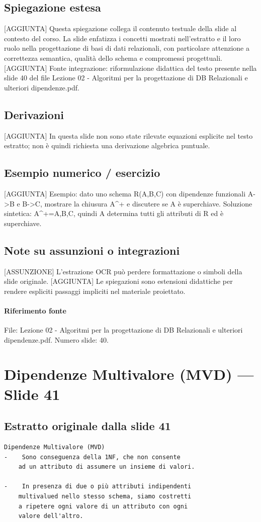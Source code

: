 \documentclass[11pt]{article}
\begin{document}
\subsection*{Spiegazione estesa}
[AGGIUNTA] Questa spiegazione collega il contenuto testuale della slide al contesto del corso. La slide enfatizza i concetti mostrati nell'estratto e il loro ruolo nella progettazione di basi di dati relazionali, con particolare attenzione a correttezza semantica, qualità dello schema e compromessi progettuali.
[AGGIUNTA] Fonte integrazione: riformulazione didattica del testo presente nella slide 40 del file Lezione 02 - Algoritmi per la progettazione di DB Relazionali e ulteriori dipendenze.pdf.
\subsection*{Derivazioni}
[AGGIUNTA] In questa slide non sono state rilevate equazioni esplicite nel testo estratto; non è quindi richiesta una derivazione algebrica puntuale.
\subsection*{Esempio numerico / esercizio}
[AGGIUNTA] Esempio: dato uno schema R(A,B,C) con dipendenze funzionali A->B e B->C, mostrare la chiusura A^+ e discutere se A è superchiave. Soluzione sintetica: A^+={A,B,C}, quindi A determina tutti gli attributi di R ed è superchiave.
\subsection*{Note su assunzioni o integrazioni}
[ASSUNZIONE] L'estrazione OCR può perdere formattazione o simboli della slide originale.
[AGGIUNTA] Le spiegazioni sono estensioni didattiche per rendere espliciti passaggi impliciti nel materiale proiettato.
\paragraph{Riferimento fonte} File: Lezione 02 - Algoritmi per la progettazione di DB Relazionali e ulteriori dipendenze.pdf. Numero slide: 40.
\section{Dipendenze Multivalore (MVD) --- Slide 41}
\subsection*{Estratto originale dalla slide 41}
\begin{lstlisting}
Dipendenze Multivalore (MVD)
-    Sono conseguenza della 1NF, che non consente
    ad un attributo di assumere un insieme di valori.

-    In presenza di due o più attributi indipendenti
    multivalued nello stesso schema, siamo costretti
    a ripetere ogni valore di un attributo con ogni
    valore dell'altro.
\end{lstlisting}
\end{document}
